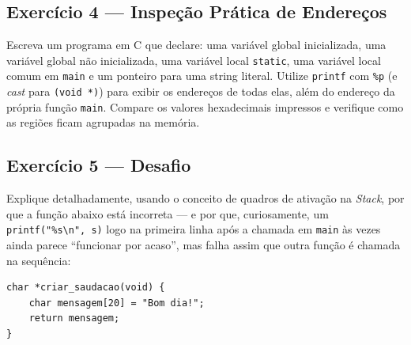 \begin{exercicio}
\subsection*{Exercício 4 --- Inspeção Prática de Endereços}
Escreva um programa em C que declare: uma variável global inicializada, uma variável global não inicializada, uma variável local \texttt{static}, uma variável local comum em \texttt{main} e um ponteiro para uma string literal. Utilize \texttt{printf} com \texttt{\%p} (e \textit{cast} para \texttt{(void *)}) para exibir os endereços de todas elas, além do endereço da própria função \texttt{main}. Compare os valores hexadecimais impressos e verifique como as regiões ficam agrupadas na memória.

\subsection*{Exercício 5 --- Desafio}
Explique detalhadamente, usando o conceito de quadros de ativação na \textit{Stack}, por que a função abaixo está incorreta — e por que, curiosamente, um \texttt{printf("\%s\textbackslash n", s)} logo na primeira linha após a chamada em \texttt{main} às vezes ainda parece ``funcionar por acaso'', mas falha assim que outra função é chamada na sequência:

\begin{lstlisting}
char *criar_saudacao(void) {
    char mensagem[20] = "Bom dia!";
    return mensagem;
}
\end{lstlisting}

\end{exercicio}
